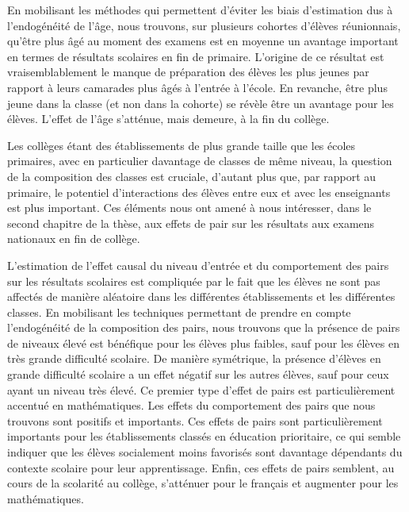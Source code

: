 \documentclass[
]{book}
\begin{document}
En mobilisant les méthodes qui permettent d'éviter les biais d'estimation dus à l'endogénéité de l'âge, nous trouvons, sur plusieurs cohortes d'élèves réunionnais, qu'être plus âgé au moment des examens est en moyenne un avantage important en termes de résultats scolaires en fin de primaire. L'origine de ce résultat est vraisemblablement le manque de préparation des élèves les plus jeunes par rapport à leurs camarades plus âgés à l'entrée à l'école. En revanche, être plus jeune dans la classe (et non dans la cohorte) se révèle être un avantage pour les élèves. L'effet de l'âge s'atténue, mais demeure, à la fin du collège.

\quad Les collèges étant des établissements de plus grande taille que les écoles primaires, avec en particulier davantage de classes de même niveau, la question de la composition des classes est cruciale, d'autant plus que, par rapport au primaire, le potentiel d'interactions des élèves entre eux et avec les enseignants est plus important. Ces éléments nous ont amené à nous intéresser, dans le second chapitre de la thèse, aux effets de pair sur les résultats aux examens nationaux en fin de collège.

L'estimation de l'effet causal du niveau d'entrée et du comportement des pairs sur les résultats scolaires est compliquée par le fait que les élèves ne sont pas affectés de manière aléatoire dans les différentes établissements et les différentes classes. En mobilisant les techniques permettant de prendre en compte l'endogénéité de la composition des pairs, nous trouvons que la présence de pairs de niveaux élevé est bénéfique pour les élèves plus faibles, sauf pour les élèves en très grande difficulté scolaire. De manière symétrique, la présence d'élèves en grande difficulté scolaire a un effet négatif sur les autres élèves, sauf pour ceux ayant un niveau très élevé. Ce premier type d'effet de pairs est particulièrement accentué en mathématiques. Les effets du comportement des pairs que nous trouvons sont positifs et importants. Ces effets de pairs sont particulièrement importants pour les établissements classés en éducation prioritaire, ce qui semble indiquer que les élèves socialement moins favorisés sont davantage dépendants du contexte scolaire pour leur apprentissage. Enfin, ces effets de pairs semblent, au cours de la scolarité au collège, s'atténuer pour le français et augmenter pour les mathématiques.
\end{document}
